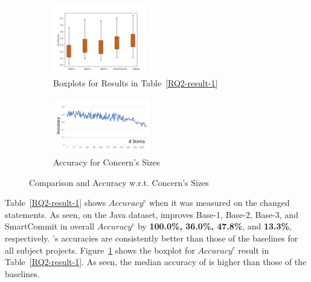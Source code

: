 \begin{figure}
  \centering
  \vspace{-12pt}
	\begin{subfigure}{0.235\textwidth}
	\centering
	\includegraphics[width=1.6in]{figures/RQ_2_1.png}
	\vspace{-8pt}
	\caption{Boxplots for Results in Table~\ref{RQ2-result-1}}
	\label{RQ2-result-2}
	\end{subfigure}
\hfill
	\begin{subfigure}{0.225\textwidth}
		\centering
		\includegraphics[width=1.7in]{figures/accuracy-concerns-java.png}
		\vspace{-8pt}
		\caption{Accuracy for Concern's Sizes}
		\label{RQ2-result-3}
	\end{subfigure}
	\label{RQ2-result-4}
	\vspace{-12pt}
	\caption{Comparison and Accuracy w.r.t. Concern's Sizes}
\end{figure}

Table~\ref{RQ2-result-1} shows
$Accuracy^{c}$ when it was measured on the changed statements.
As seen, on the Java dataset, {\tool} improves Base-1, Base-2, Base-3,
and SmartCommit in overall $Accuracy^c$ by {\bf 100.0\%, 36.0\%,
  47.8\%}, and {\bf 13.3\%}, respectively. {\tool}'s accuracies are
consistently better than those of the baselines for all subject
projects. Figure~\ref{RQ2-result-2} shows the boxplot for $Accuracy^c$
result in Table~\ref{RQ2-result-1}. As seen, the median accuracy of
{\tool} is higher than those of the baselines.


